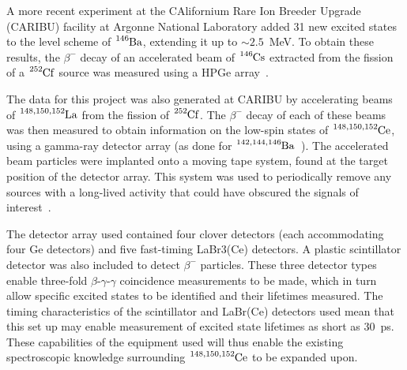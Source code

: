\documentclass[12pt,a4paper]{article}
\begin{document}
\medskip
\noindent
A more recent experiment at the CAlifornium Rare Ion Breeder Upgrade (CARIBU) facility at Argonne National Laboratory added 31 new excited states to the level scheme of $\ce{^{146}Ba}$, extending it up to $\sim2.5$~MeV.
To obtain these results, the $\beta^-$ decay of an accelerated beam of $\ce{^{146}Cs}$ extracted from the %
fission of a $\ce{^{252}Cf}$ source was measured using a HPGe array~\cite{mitchell__2016}.
%

\medskip
\noindent
The data for this project was also generated at CARIBU by accelerating beams of $\ce{^{148,150,152}La}$ from the fission of $\ce{^{252}Cf}$.
The $\beta^-$ decay of each of these beams was then measured to obtain information on the low-spin states of $\ce{^{148,150,152}Ce}$, using a gamma-ray detector array (as done for $\ce{^{142,144,146}Ba}$~\cite{mach_influence_1990}). 
The accelerated beam particles were implanted onto a moving tape system, found at the target position of the detector array.
This system was used to periodically remove any sources with a long-lived activity that could have obscured the signals of interest~\cite{mitchell_x-array_2014}.

\medskip
\noindent
The detector array used contained four clover detectors (each accommodating four Ge detectors) and five fast-timing LaBr3(Ce) detectors.
A plastic scintillator detector was also included to detect $\beta^-$ particles.
These three detector types enable three-fold $\beta$-$\gamma$-$\gamma$ coincidence measurements to be made, which in turn allow specific excited states to be identified and their lifetimes measured.
The timing characteristics of the scintillator and LaBr(Ce) detectors used mean that this set up may enable measurement of excited state lifetimes as short as 30~ps.
These capabilities of the equipment used will thus enable the existing spectroscopic knowledge surrounding $\ce{^{148,150,152}Ce}$ to be expanded upon.
\end{document}
